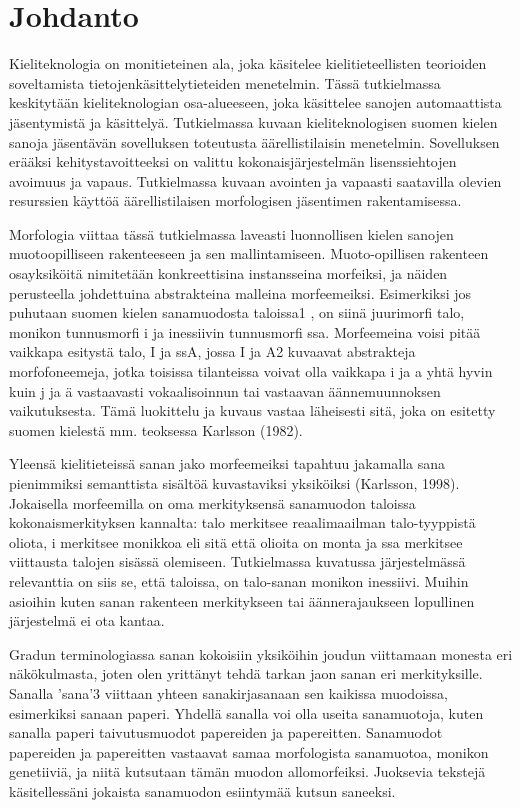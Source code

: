 \documentclass[free]{flammie}
\begin{document}
\section{Johdanto}

Kieliteknologia on monitieteinen ala, joka käsitelee kielitieteellisten
teorioiden soveltamista tietojenkäsittelytieteiden menetelmin. Tässä
tutkielmassa keskitytään kieliteknologian osa-alueeseen, joka käsittelee sanojen
automaattista jäsentymistä ja käsittelyä. Tutkielmassa kuvaan kieliteknologisen
suomen kielen sanoja jäsentävän sovelluksen toteutusta äärellistilaisin
menetelmin. Sovelluksen erääksi kehitystavoitteeksi on valittu
kokonaisjärjestelmän lisenssiehtojen avoimuus ja vapaus. Tutkielmassa kuvaan
avointen ja vapaasti saatavilla olevien resurssien käyttöä äärellistilaisen
morfologisen jäsentimen rakentamisessa.

Morfologia viittaa tässä tutkielmassa
laveasti luonnollisen kielen sanojen muotoopilliseen rakenteeseen ja sen
mallintamiseen. Muoto-opillisen rakenteen osayksiköitä nimitetään konkreettisina
instansseina morfeiksi, ja näiden perusteella johdettuina abstrakteina malleina
morfeemeiksi. Esimerkiksi jos puhutaan suomen kielen sanamuodosta taloissa1 , on
siinä juurimorfi talo, monikon tunnusmorfi i ja inessiivin tunnusmorfi ssa.
Morfeemeina voisi pitää vaikkapa esitystä talo, I ja ssA, jossa I ja A2 kuvaavat
abstrakteja morfofoneemeja, jotka toisissa tilanteissa voivat olla vaikkapa i ja
a yhtä hyvin kuin j ja ä vastaavasti vokaalisoinnun tai vastaavan
äännemuunnoksen vaikutuksesta. Tämä luokittelu ja kuvaus vastaa läheisesti sitä,
joka on esitetty suomen kielestä mm. teoksessa Karlsson (1982).

Yleensä
kielitieteissä sanan jako morfeemeiksi tapahtuu jakamalla sana pienimmiksi
semanttista sisältöä kuvastaviksi yksiköiksi (Karlsson, 1998). Jokaisella
morfeemilla on oma merkityksensä sanamuodon taloissa kokonaismerkityksen
kannalta: talo merkitsee reaalimaailman talo-tyyppistä oliota, i merkitsee
monikkoa eli sitä että olioita on monta ja ssa merkitsee viittausta talojen
sisässä olemiseen. Tutkielmassa kuvatussa järjestelmässä relevanttia on siis se,
että taloissa, on talo-sanan monikon inessiivi. Muihin asioihin kuten sanan
rakenteen merkitykseen tai äännerajaukseen lopullinen järjestelmä ei ota kantaa.

Gradun terminologiassa sanan kokoisiin yksiköihin joudun viittamaan monesta eri
näkökulmasta, joten olen yrittänyt tehdä tarkan jaon sanan eri merkityksille.
Sanalla ’sana’3 viittaan yhteen sanakirjasanaan sen kaikissa muodoissa,
esimerkiksi sanaan paperi. Yhdellä sanalla voi olla useita sanamuotoja, kuten
sanalla paperi taivutusmuodot papereiden ja papereitten. Sanamuodot papereiden
ja papereitten vastaavat samaa morfologista sanamuotoa, monikon genetiiviä, ja
niitä kutsutaan tämän muodon allomorfeiksi. Juoksevia tekstejä käsitellessäni
jokaista sanamuodon esiintymää kutsun saneeksi.
\end{document}
